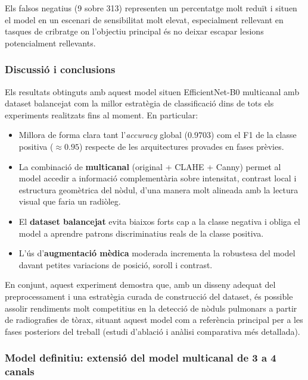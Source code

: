\documentclass[12pt,a4paper]{article}
\begin{document}
Els falsos negatius (9 sobre 313) representen un percentatge molt reduït i situen el model en un escenari
de sensibilitat molt elevat, especialment rellevant en tasques de cribratge on l’objectiu principal és
no deixar escapar lesions potencialment rellevants.

\subsubsection{Discussió i conclusions}

Els resultats obtinguts amb aquest model situen EfficientNet-B0 multicanal amb dataset balancejat com la
millor estratègia de classificació dins de tots els experiments realitzats fins al moment. En particular:

\begin{itemize}
    \item Millora de forma clara tant l’\textit{accuracy} global (\(0.9703\)) com el F1 de la classe positiva
          (\(\approx 0.95\)) respecte de les arquitectures provades en fases prèvies.
    \item La combinació de \textbf{multicanal} (original + CLAHE + Canny) permet al model accedir a informació
          complementària sobre intensitat, contrast local i estructura geomètrica del nòdul, d’una manera molt
          alineada amb la lectura visual que faria un radiòleg.
    \item El \textbf{dataset balancejat} evita biaixos forts cap a la classe negativa i obliga el model a aprendre
          patrons discriminatius reals de la classe positiva.
    \item L’ús d’\textbf{augmentació mèdica} moderada incrementa la robustesa del model davant petites variacions
          de posició, soroll i contrast.
\end{itemize}

En conjunt, aquest experiment demostra que, amb un disseny adequat del preprocessament i una estratègia
curada de construcció del dataset, és possible assolir rendiments molt competitius en la detecció de
nòduls pulmonars a partir de radiografies de tòrax, situant aquest model com a referència principal per a
les fases posteriors del treball (estudi d’ablació i anàlisi comparativa més detallada).

\subsubsection{Model definitiu: extensió del model multicanal de 3 a 4 canals}
\end{document}
